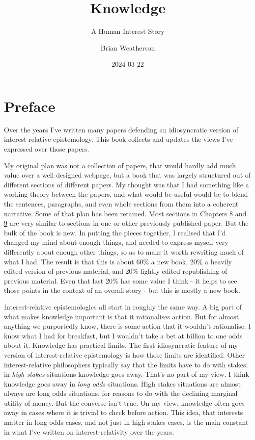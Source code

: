 \documentclass[
  12pt,
  letterpaper,
]{scrbook}
\title{Knowledge}
\subtitle{A Human Interest Story}
\author{Brian Weatherson}
\date{2024-03-22}
\renewcommand*\contentsname{Table of contents}
\newcommand\contentsname{Table of contents}
\begin{document}
\frontmatter
\maketitle

\renewcommand*\contentsname{Table of contents}
{
\hypersetup{linkcolor=}
\setcounter{tocdepth}{2}
\tableofcontents
}
\mainmatter
{}

\chapter*{Preface}\label{sec-preface}


Over the years I've written many papers defending an idiosyncratic
version of interest-relative epistemology. This book collects and
updates the views I've expressed over those papers.

My original plan was not a collection of papers, that would hardly add
much value over a well designed webpage, but a book that was largely
structured out of different sections of different papers. My thought was
that I had something like a working theory between the papers, and what
would be useful would be to blend the sentences, paragraphs, and even
whole sections from them into a coherent narrative. Some of that plan
has been retained. Most sections in Chapters \hyperref[sec-ratbel]{8}
and \hyperref[sec-evidence]{9} are very similar to sections in one or
other previously published paper. But the bulk of the book is new. In
putting the pieces together, I realised that I'd changed my mind about
enough things, and needed to express myself very differently about
enough other things, so as to make it worth rewriting much of what I
had. The result is that this is about 60\% a new book, 20\% a heavily
edited version of previous material, and 20\% lightly edited
republishing of previous material. Even that last 20\% has some value I
think - it helps to see those points in the context of an overall story
- but this is mostly a new book.

Interest-relative epistemologies all start in roughly the same way. A
big part of what makes knowledge important is that it rationalises
action. But for almost anything we purportedly know, there is some
action that it wouldn't rationalise. I know what I had for breakfast,
but I wouldn't take a bet at billion to one odds about it. Knowledge has
practical limits. The first idiosyncratic feature of my version of
interest-relative epistemology is how those limits are identified. Other
interest-relative philosophers typically say that the limits have to do
with stakes; in \emph{high stakes} situations knowledge goes away.
That's no part of my view. I think knowledge goes away in \emph{long
odds} situations. High stakes situations are almost always are long odds
situations, for reasons to do with the declining marginal utility of
money. But the converse isn't true. On my view, knowledge often goes
away in cases where it is trivial to check before action. This idea,
that interests matter in long odds cases, and not just in high stakes
cases, is the main constant in what I've written on interest-relativity
over the years.
\end{document}
